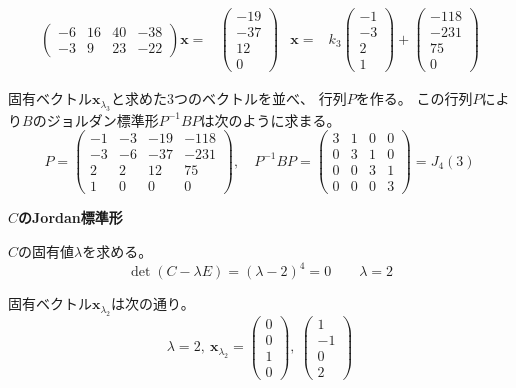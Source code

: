 \documentclass[12pt,b5paper]{ltjsarticle}
\begin{document}
\begin{align}
\begin{pmatrix}
  -6 & 16 & 40 & -38\\
  -3 & 9 & 23 & -22
 \end{pmatrix}
 \bm{x}
 =&
 \begin{pmatrix} -19 \\ -37 \\ 12 \\ 0 \end{pmatrix}
 &
 \bm{x}=&
 k_3\begin{pmatrix} -1 \\ -3 \\ 2 \\ 1 \end{pmatrix}
 +\begin{pmatrix} -118 \\ -231 \\ 75 \\ 0 \end{pmatrix}
\end{align}

固有ベクトル$\bm{x}_{\lambda_3}$と求めた3つのベクトルを並べ、
行列$P$を作る。
この行列$P$により$B$のジョルダン標準形$P^{-1}BP$は次のように求まる。
\begin{equation}
 P=
 \begin{pmatrix}
  -1 & -3 & -19 & -118\\
  -3 & -6 & -37 & -231\\
  2 & 2 & 12 & 75\\
  1 & 0 & 0 & 0
 \end{pmatrix}
 ,\quad
 P^{-1}BP=
 \begin{pmatrix}
  3 & 1 & 0 & 0\\
  0 & 3 & 1 & 0\\
  0 & 0 & 3 & 1\\
  0 & 0 & 0 & 3
 \end{pmatrix}
 =J_4(3)
\end{equation}


\dotfill
\textbf{$C$のJordan標準形}
\dotfill

$C$の固有値$\lambda$を求める。
\begin{equation}
 \det(C-\lambda E)=(\lambda-2)^4=0
  \qquad \lambda=2
\end{equation}

固有ベクトル$\bm{x}_{\lambda_2}$は次の通り。
\begin{equation}
 \lambda =2 ,\
 \bm{x}_{\lambda_2}=
 \begin{pmatrix}0\\0\\1\\0\end{pmatrix},\
 \begin{pmatrix}1\\-1\\0\\2\end{pmatrix}
\end{equation}
\end{document}
